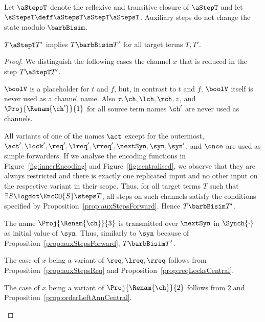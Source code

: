 \documentclass[]{eptcs}
\begin{document}
\noindent
Let $ \aStepsT $ denote the reflexive and transitive closure of $ \aStepT $ and let $ \sStepsT \deff \aStepsT \sStepT \aStepsT $.
Auxiliary steps do not change the state modulo $ \barbBisim $.

\begin{lemma}
	$ T \aStepT T' $ implies $ T \barbBisim T' $ for all target terms $ T, T' $.
	\label{lem:auxStepsCentral}
\end{lemma}

\begin{proof}
	We distinguish the following cases \wrt the channel $ x $ that is reduced in the step $ T \aStepT T' $.
	\begin{compactenum}

		\item $ \boolV $ is a placeholder for $ t $ and $ f $, but, in contrast to $ t $ and $ f $, $ \boolV $ itself is never used as a channel name. Also $ \tau, \ch, \lch, \rch, z $, and $ \Proj{\Renam{\ch'}}{1} $ for all source term names $ \ch' $ are never used as channels.
		\item All variants of one of the names $ \act $ except for the outermost, $ \act', \lock', \req', \lreq', \rreq', \nextSyn, \syn, \syn' $, and $ \once $ are used as simple forwarders. If we analyse the encoding functions in Figure~\ref{fig:innerEncoding} and Figure~\ref{fig:centralised}, we observe that they are always restricted and there is exactly one replicated input and no other input on the respective variant in their scope. Thus, for all target terms $ T $ such that $ \exists S\logdot \EncCO{S} \steps T $, all steps on such channels satisfy the conditions specified by Proposition~\ref{prop:auxStepsForward}. Hence $ T \barbBisim T' $.
		\item The name $ \Proj{\Renam{\ch}}{3} $ is transmitted over $ \nextSyn $ in $ \Synch{\cdot} $ as initial value of $ \syn $. Thus, similarly to $ \syn $ because of Proposition~\ref{prop:auxStepsForward}, $ T \barbBisim T' $.
		\item The case of $ x $ being a variant of $ \req, \lreq, \rreq $ follows from Proposition~\ref{prop:auxStepsReq} and Proposition~\ref{prop:reqLocksCentral}.
		\item The case of $ x $ being a variant of $ \Proj{\Renam{\ch}}{2} $ follows from 2.\@ and Proposition~\ref{prop:orderLeftAnnCentral}.

\end{compactenum}
\end{proof}
\end{document}
